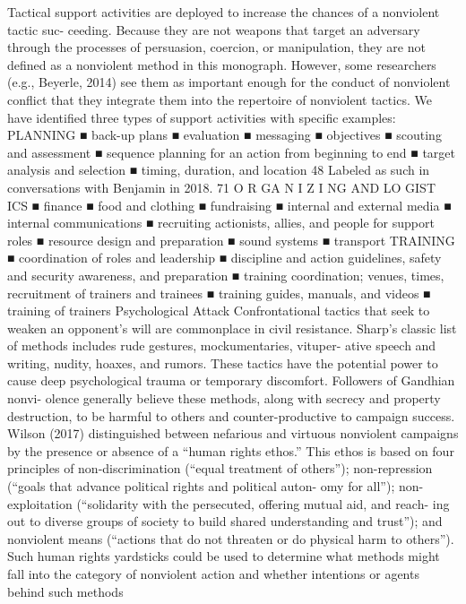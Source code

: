 \documentclass[twoside,a4paper,12pt,fleqn,openany]{extbook}
\begin{document}
Tactical support activities are deployed to increase the chances of a nonviolent tactic suc-
ceeding. Because they are not weapons that target an adversary through the processes of
persuasion, coercion, or manipulation, they are not defined as a nonviolent method in this
monograph. However, some researchers (e.g., Beyerle, 2014) see them as important enough
for the conduct of nonviolent conflict that they integrate them into the repertoire of nonviolent
tactics. We have identified three types of support activities with specific examples:
PLANNING
■
 back-up plans
■
 evaluation
■
 messaging
■
 objectives
■
 scouting and assessment
■
 sequence planning for an action from beginning to end
■
 target analysis and selection
■
 timing, duration, and location
48
Labeled as such in conversations with Benjamin in 2018.
71
O R GA N I Z I NG AND LO GIST ICS
■
 finance
■
 food and clothing
■
 fundraising
■
 internal and external media
■
 internal communications
■
 recruiting actionists, allies, and people for support roles
■
 resource design and preparation
■
 sound systems
■
 transport
TRAINING
■
 coordination of roles and leadership
■
 discipline and action guidelines, safety and security awareness, and preparation
■
 training coordination; venues, times, recruitment of trainers and trainees
■
 training guides, manuals, and videos
■
 training of trainers
Psychological Attack
Confrontational tactics that seek to weaken an opponent’s will are commonplace in civil
resistance. Sharp’s classic list of methods includes rude gestures, mockumentaries, vituper-
ative speech and writing, nudity, hoaxes, and rumors. These tactics have the potential power
to cause deep psychological trauma or temporary discomfort. Followers of Gandhian nonvi-
olence generally believe these methods, along with secrecy and property destruction, to be
harmful to others and counter-productive to campaign success. Wilson (2017) distinguished
between nefarious and virtuous nonviolent campaigns by the presence or absence of a
“human rights ethos.” This ethos is based on four principles of non-discrimination (“equal
treatment of others”); non-repression (“goals that advance political rights and political auton-
omy for all”); non-exploitation (“solidarity with the persecuted, offering mutual aid, and reach-
ing out to diverse groups of society to build shared understanding and trust”); and nonviolent
means (“actions that do not threaten or do physical harm to others”).
Such human rights yardsticks could be used to determine what methods might fall into
the category of nonviolent action and whether intentions or agents behind such methods
\end{document}
